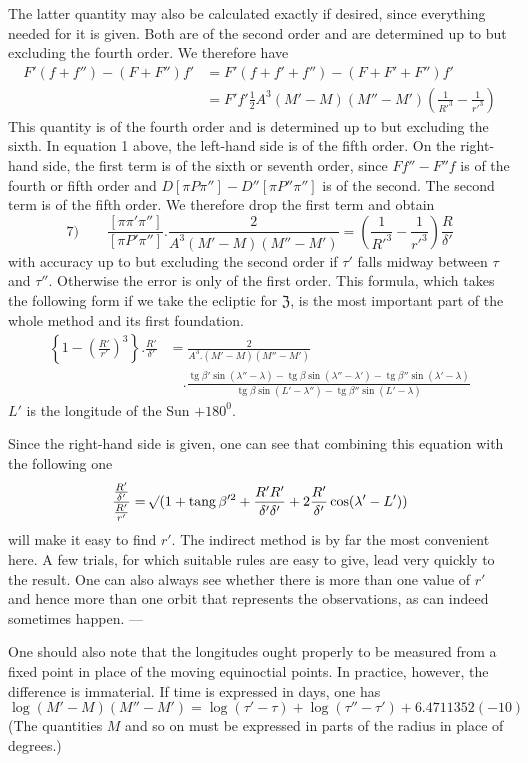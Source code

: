 The latter quantity may also be calculated exactly if desired, since everything needed for it is given. Both are of the second order and are determined up to but excluding the fourth order. We therefore have
\[
\begin{aligned}
F'(f+f'')-(F+F'')f'&=F'(f+f'+f'')-(F+F'+F'')f'\\
&=F'f'\tfrac12A^3(M'-M)(M''-M')\left(\frac1{R'^3}-\frac1{r'^3}\right)
\end{aligned}
\]
This quantity is of the fourth order and is determined up to but excluding the sixth. In equation 1 above, the left-hand side is of the fifth order. On the right-hand side, the first term is of the sixth or seventh order, since $Ff''-F''f$ is of the fourth or fifth order and $D[\pi P\pi'']-D''[\pi P''\pi'']$ is of the second. The second term is of the fifth order. We therefore drop the first term and obtain
\[
7)\qquad\frac{[\pi\pi'\pi'']}{[\pi P'\pi'']}.\frac2{A^3(M'-M)(M''-M')}=\left(\frac1{R'^3}-\frac1{r'^3}\right)\frac R{\delta'}
\]
%
with accuracy up to but excluding the second order if $\tau'$ falls midway between $\tau$ and $\tau''$. Otherwise the error is only of the first order. This formula, which takes the following form if we take the ecliptic for $\mathfrak{Z}$, is the most important part of the whole method and its first foundation.
\[
\begin{aligned}
\left\{1-\left(\frac{R'}{r'}\right)^3\right\}.\frac{R'}{\delta'}&=\frac2{A^3.(M'-M)(M''-M')}\\
&\quad.\frac{\operatorname{tg}\beta'\sin(\lambda''-\lambda)-\operatorname{tg}\beta\sin(\lambda''-\lambda')-\operatorname{tg}\beta''\sin(\lambda'-\lambda)}{\operatorname{tg}\beta\sin(L'-\lambda'')-\operatorname{tg}\beta''\sin(L'-\lambda)}
\end{aligned}
\]
$L'$ is the longitude of the Sun $+180^0$.

Since the right-hand side is given, one can see that combining this equation with the following one
\[
\frac{\frac{R'}{\delta'}}{\frac{R'}{r'}}=\mathord{{}^{}\!\surd}(1+\operatorname{tang}\beta'^2+\frac{R'R'}{\delta'\delta'}+2\frac{R'}{\delta'}\cos(\lambda'-L'))
\]
will make it easy to find $r'$. The indirect method is by far the most convenient here. A few trials, for which suitable rules are easy to give, lead very quickly to the result. One can also always see whether there is more than one value of $r'$ and hence more than one orbit that represents the observations, as can indeed sometimes happen. —

One should also note that the longitudes ought properly to be measured from a fixed point in place of the moving equinoctial points. In practice, however, the difference is immaterial. If time is expressed in days, one has
\[
\log(M'-M)(M''-M')=\log(\tau'-\tau)+\log(\tau''-\tau')+6.4711352(-10)
\]
(The quantities $M$ and so on must be expressed in parts of the radius in place of degrees.)

